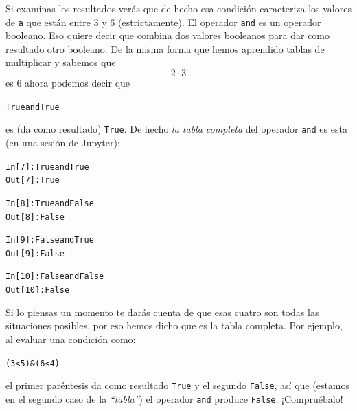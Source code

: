 \documentclass[10pt,a4paper]{article}\usepackage[]{graphicx}\usepackage[]{color}
\makeatletter
\newcommand{\hlnum}[1]{\textcolor[rgb]{0.686,0.059,0.569}{#1}}%
\newcommand{\hlopt}[1]{\textcolor[rgb]{0,0,0}{#1}}%
\newcommand{\hlstd}[1]{\textcolor[rgb]{0.345,0.345,0.345}{#1}}%
\newenvironment{kframe}{%
 \def\at@end@of@kframe{}%
 \ifinner\ifhmode%
  \def\at@end@of@kframe{\end{minipage}}%
  \begin{minipage}{\columnwidth}%
 \fi\fi%
 \def\FrameCommand##1{\hskip\@totalleftmargin \hskip-\fboxsep
 \colorbox{shadecolor}{##1}\hskip-\fboxsep
     \hskip-\linewidth \hskip-\@totalleftmargin \hskip\columnwidth}%
 \MakeFramed {\advance\hsize-\width
   \@totalleftmargin\z@ \linewidth\hsize
   \@setminipage}}%
 {\par\unskip\endMakeFramed%
 \at@end@of@kframe}
\newenvironment{knitrout}{}{} %
\makeatother
\begin{document}
Si examinas los resultados verás que de hecho esa condición caracteriza los valores de {\tt a} que están entre 3 y 6 (estrictamente). El operador {\tt and} es un {\sf operador booleano}. Eso quiere decir que combina dos valores booleanos para dar como resultado otro booleano.  De la misma forma que hemos aprendido tablas de multiplicar y sabemos que
\[
2 \cdot 3
\]
es 6 ahora podemos decir que
\begin{knitrout}
\color{fgcolor}\begin{kframe}
\begin{alltt}
True and True
\end{alltt}
\end{kframe}
\end{knitrout}
es (da como resultado) {\tt True}. De hecho {\em la tabla completa} del operador {\tt and} es esta (en una sesión de Jupyter):
\begin{knitrout}
\color{fgcolor}\begin{kframe}
\begin{alltt}
In [7]: True and True
Out[7]: True

In [8]: True and False
Out[8]: False

In [9]: False and True
Out[9]: False

In [10]: False and False
Out[10]: False
\end{alltt}
\end{kframe}
\end{knitrout}
Si lo piensas un momento te darás cuenta de que esas cuatro son todas las situaciones posibles, por eso hemos dicho que es la tabla completa. Por ejemplo, al evaluar una condición como:
\begin{knitrout}
\color{fgcolor}\begin{kframe}
\begin{alltt}
 \hlstd{(}\hlnum{3} \hlopt{<} \hlnum{5}\hlstd{)} \hlopt{&} \hlstd{(}\hlnum{6} \hlopt{<} \hlnum{4}\hlstd{)}
\end{alltt}
\end{kframe}
\end{knitrout}
el primer paréntesis da como resultado {\tt True} y el segundo {\tt False}, así que (estamos en el segundo caso de la {\em ``tabla''}) el operador {\tt and} produce {\tt False}. ¡Compruébalo!
\end{document}
